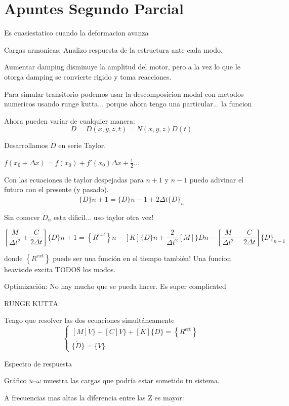 \documentclass[11pt, a4paper,titlepage]{article}
\begin{document}
\section{Apuntes Segundo Parcial}

Es cuasiestatico cuando la deformacion avanza 

Cargas armonicas: Analizo respuesta de la estructura ante cada modo. 

Aumentar damping disminuye la amplitud del motor, pero a la vez lo que le otorga damping se convierte rigido y toma reacciones.

Para simular transitorio podemos usar la descomposicion modal con metodos numericos usando runge kutta... porque ahora tengo una particular... la funcion 

Ahora pueden variar de cualquier manera:
\[
D=D(x,y,z,t) = N(x,y,z)D(t)
\]

Desarrollamos $D$ en serie Taylor.

$f(x_0+\Delta x)= f(x_0) + f'(x_0) \Delta x +\tfrac{1}{2}...$

Con las ecuaciones de taylor despejadas para $n+1$ y $n-1$ puedo adivinar el futuro con el presente (y pasado).
\[
\{D\}{n+1}=\{D\}{n-1}+2 \Delta t\{\dot{D}\}_{n}
\]

Sin conocer $\dot{D}_{n}$ esta dificil... uso taylor otra vez!

\[
\left[\frac{M}{\Delta t^{2}}+\frac{C}{2 \Delta t}\right]\{D\}{n+1}=\left\{R^{e x t}\right\}{n}-[K]\{D\}{n}+\frac{2}{\Delta t^{2}}[M] \} D{n}-\left[\frac{M}{\Delta t^{2}}-\frac{C}{2 \Delta t}\right]\{D\}_{n-1}
\]

donde $\left\{ R^{e x t}\right\}$ puede ser una función en el tiempo también! Una funcion heaviside excita TODOS los modos.

Optimización: No hay mucho que se pueda hacer. Es super complicated

RUNGE KUTTA

Tengo que resolver las dos ecuaciones simultáneamente
\[
\left\{\begin{array}{l}{[M] \dot{V} \}+[C] V \}+[K]\{D\}=\left\{R^{\text {ert}}\right\}} \\ {\{\dot{D}\}=\{V\}}\end{array}\right.
\]

Espectro de respuesta


Gráfico $\ddot{u}$--$\omega$ muestra las cargas que podría estar sometido tu sistema.

A frecuencias mas altas la diferencia entre las Z es mayor:
\end{document}
